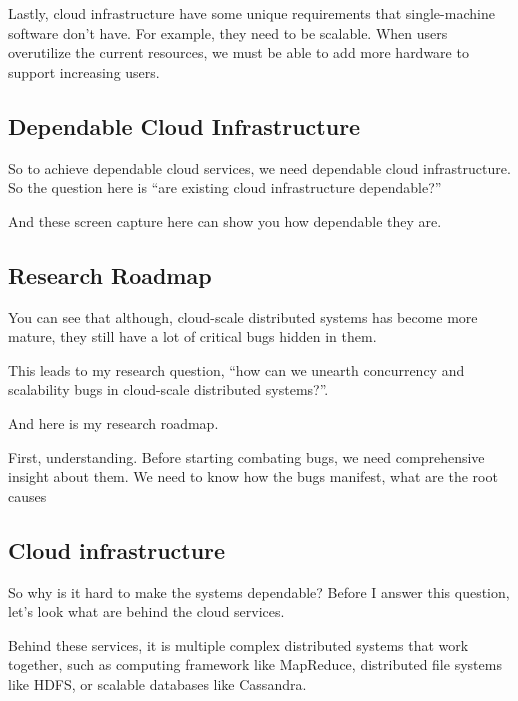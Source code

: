 Lastly, cloud infrastructure have some unique requirements that single-machine
software don't have. For example, they need to be scalable. When users
overutilize the current resources, we must be able to add more hardware to
support increasing users.

\subsection{Dependable Cloud Infrastructure}

So to achieve dependable cloud services, we need dependable cloud
infrastructure. So the question here is ``are existing cloud infrastructure
dependable?''

And these screen capture here can show you how dependable they are.

\subsection{Research Roadmap}

You can see that although, cloud-scale distributed systems has become more
mature, they still have a lot of critical bugs hidden in them. 

This leads to my research question, ``how can we unearth concurrency and
scalability bugs in cloud-scale distributed systems?''.

And here is my research roadmap.

First, understanding. Before starting combating bugs, we need comprehensive
insight about them. We need to know how the bugs manifest, what are the root
causes

\subsection{}


\subsection{Cloud infrastructure}

So why is it hard to make the systems dependable? Before I answer this question,
let's look what are behind the cloud services. 

Behind these services, it is multiple complex distributed systems that work
together, such as computing framework like MapReduce, distributed file systems
like HDFS, or scalable databases like Cassandra.

\fi
